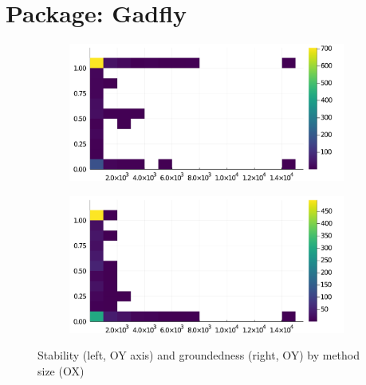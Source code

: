 \section*{Package: Gadfly}
\begin{figure}[h]
     \begin{subfigure}[b]{0.49\textwidth}
       \includegraphics[width=\textwidth]{figs/all-package-graphs/Gadfly-size-vs-stable.pdf}
     \end{subfigure}
     \begin{subfigure}[b]{0.49\textwidth}
       \includegraphics[width=\textwidth]{figs/all-package-graphs/Gadfly-size-vs-grounded.pdf}
     \end{subfigure}
\caption{Stability (left, OY axis) and groundedness (right, OY) by method size (OX)}%
%
\label{figs:size:Gadfly}
\end{figure}

